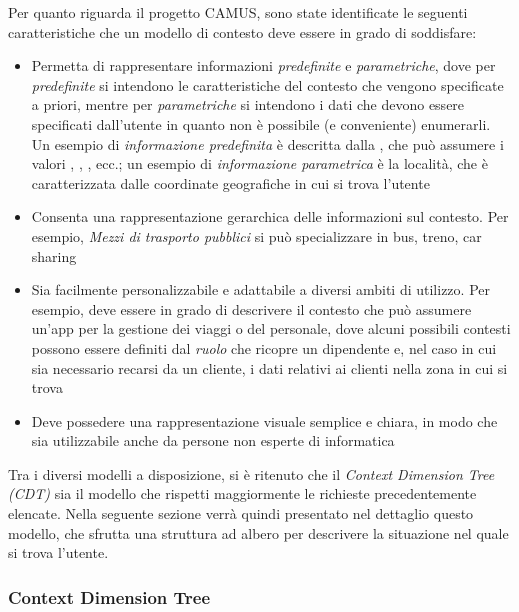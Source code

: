 Per quanto riguarda il progetto CAMUS, sono state identificate le seguenti caratteristiche che un modello di contesto deve essere in grado di soddisfare:

\begin{itemize}
	\item
	Permetta di rappresentare informazioni \emph{predefinite} e \emph{parametriche}, dove per \emph{predefinite} si intendono le caratteristiche del contesto che vengono specificate a priori, mentre per \emph{parametriche} si intendono i dati che devono essere specificati dall'utente in quanto non è possibile (e conveniente) enumerarli. Un esempio di \emph{informazione predefinita} è descritta dalla , che può assumere i valori , , , ecc.; un esempio di \emph{informazione parametrica} è la località, che è caratterizzata dalle coordinate geografiche in cui si trova l'utente
	\item
	Consenta una rappresentazione gerarchica delle informazioni sul contesto. Per esempio, \emph{Mezzi di trasporto pubblici} si può specializzare in bus, treno, car sharing
	\item
	Sia facilmente personalizzabile e adattabile a diversi ambiti di utilizzo. Per esempio, deve essere in grado di descrivere il contesto che può assumere un'app per la gestione dei viaggi o del personale, dove alcuni possibili contesti possono essere definiti dal \emph{ruolo} che ricopre un dipendente e, nel caso in cui sia necessario recarsi da un cliente, i dati relativi ai clienti nella zona in cui si trova
	\item
	Deve possedere una rappresentazione visuale semplice e chiara, in modo che sia utilizzabile anche da persone non esperte di informatica
\end{itemize}

Tra i diversi modelli a disposizione, si è ritenuto che il \emph{Context Dimension Tree (CDT)} sia il modello che rispetti maggiormente le richieste precedentemente elencate. Nella seguente sezione verrà quindi presentato nel dettaglio questo modello, che sfrutta una struttura ad albero per descrivere la situazione nel quale si trova l'utente.

\subsubsection{Context Dimension Tree\label{sec:context-dimension-model}}

